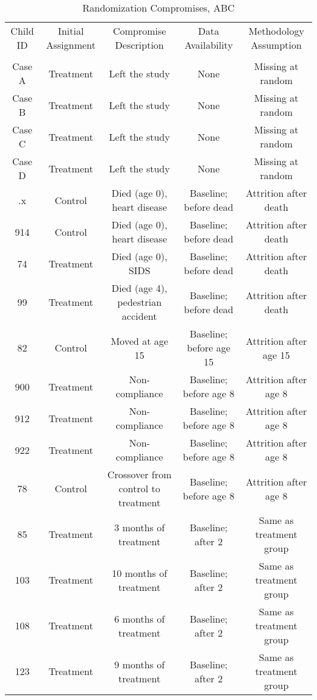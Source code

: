 \begin{sidewaystable}[H] 
\begin{threeparttable}
\caption{Randomization Compromises, ABC}
\label{table:abccompromises}
\centering
\footnotesize
\begin{tabular}{ccccc} \toprule
Child ID & Initial Assignment & Compromise Description & Data Availability & Methodology Assumption \\ \\ \midrule
Case A & Treatment & Left the study & None & Missing at random \\
Case B & Treatment & Left the study & None & Missing at random \\
Case C & Treatment & Left the study & None & Missing at random \\
Case D & Treatment & Left the study & None & Missing at random \\ \midrule
.x    & Control  & Died (age 0), heart disease & Baseline; before dead & Attrition after death \\
914 & Control  & Died (age 0), heart disease & Baseline; before dead & Attrition after death \\
74 & Treatment & Died (age 0), SIDS & Baseline; before dead & Attrition after death \\
99 & Treatment  & Died (age 4), pedestrian accident & Baseline; before dead & Attrition after death \\ \midrule
82 & Control       & Moved at age 15 &   Baseline; before age 15 & Attrition after age 15 \\ \midrule
900 & Treatment  & Non-compliance  & Baseline; before age 8 & Attrition after age 8  \\
912 & Treatment  & Non-compliance  & Baseline; before age 8 & Attrition after age 8  \\
922 & Treatment  & Non-compliance  & Baseline; before age 8 & Attrition after age 8  \\ \midrule
78  & Control        & Crossover from control to treatment & Baseline; before age 8 & Attrition after age 8  \\ \midrule
85 & Treatment   & 3 months of treatment &  Baseline; after 2 & Same as treatment group  \\  
103 & Treatment &10 months of treatment &  Baseline; after 2 & Same as treatment group  \\
108 & Treatment & 6 months of treatment &  Baseline; after 2 & Same as treatment group  \\ 
123 & Treatment & 9 months of treatment &  Baseline; after 2 & Same as treatment group  \\  \midrule

\end{tabular}
\end{threeparttable}
\end{sidewaystable}
